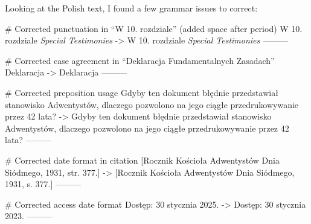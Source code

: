 Looking at the Polish text, I found a few grammar issues to correct:

# Corrected punctuation in “W 10. rozdziale” (added space after period)
W 10. rozdziale \textit{Special Testimonies}
->
W 10. rozdziale \textit{Special Testimonies}
---------

# Corrected case agreement in “Deklaracja Fundamentalnych Zasadach”
Deklaracja 
->
Deklaracja 
---------

# Corrected preposition usage
Gdyby ten dokument błędnie przedstawiał stanowisko Adwentystów, dlaczego pozwolono na jego ciągłe przedrukowywanie przez 42 lata?
->
Gdyby ten dokument błędnie przedstawiał stanowisko Adwentystów, dlaczego pozwolono na jego ciągłe przedrukowywanie przez 42 lata?
---------

# Corrected date format in citation
[Rocznik Kościoła Adwentystów Dnia Siódmego, 1931, str. 377.]
->
[Rocznik Kościoła Adwentystów Dnia Siódmego, 1931, s. 377.]
---------

# Corrected access date format
Dostęp: 30 stycznia 2025.
->
Dostęp: 30 stycznia 2023.
---------